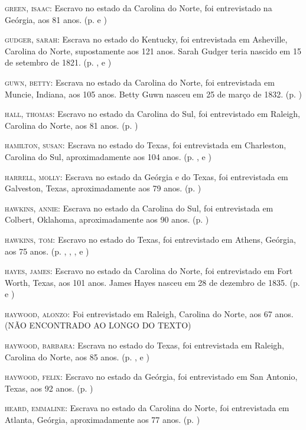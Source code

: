 \begin{Parskip}
\textsc{green, isaac:} Escravo no estado da Carolina do Norte, foi
entrevistado na Geórgia, aos 81 anos. (p. \pageref{ref112} e \pageref{ref113})

\textsc{gudger, sarah:} Escrava no estado do Kentucky, foi entrevistada
em Asheville, Carolina do Norte, supostamente aos 121 anos. Sarah Gudger
teria nascido em 15 de setembro de 1821. (p. \pageref{ref114}, \pageref{ref115} e \pageref{ref116})

\textsc{guwn, betty:} Escrava no estado da Carolina do Norte, foi
entrevistada em Muncie, Indiana, aos 105 anos. Betty Guwn nasceu em 25
de março de 1832. (p. \pageref{ref117})

\textsc{hall, thomas:} Escravo no estado da Carolina do Sul, foi
entrevistado em Raleigh, Carolina do Norte, aos 81 anos. (p. \pageref{ref118})

\textsc{hamilton, susan:} Escrava no estado do Texas, foi entrevistada
em Charleston, Carolina do Sul, aproximadamente aos 104 anos. (p. \pageref{ref119}, \pageref{ref120} e \pageref{ref121})

\textsc{harrell, molly:} Escrava no estado da Geórgia e do Texas, foi
entrevistada em Galveston, Texas, aproximadamente aos 79 anos. (p. \pageref{ref122})

\textsc{hawkins, annie:} Escrava no estado da Carolina do Sul, foi
entrevistada em Colbert, Oklahoma, aproximadamente aos 90 anos. (p. \pageref{ref123})

\textsc{hawkins, tom:} Escravo no estado do Texas, foi entrevistado em
Athens, Geórgia, aos 75 anos. (p. \pageref{ref124}, \pageref{ref125}, \pageref{ref126}, \pageref{ref127} e \pageref{ref128})

\textsc{hayes, james:} Escravo no estado da Carolina do Norte, foi
entrevistado em Fort Worth, Texas, aos 101 anos. James Hayes nasceu em
28 de dezembro de 1835. (p. \pageref{ref129} e \pageref{ref130})

\textsc{haywood, alonzo:} Foi entrevistado em Raleigh, Carolina do
Norte, aos 67 anos. (NÃO ENCONTRADO AO LONGO DO TEXTO)

\textsc{haywood, barbara:} Escrava no estado do Texas, foi entrevistada
em Raleigh, Carolina do Norte, aos 85 anos. (p. \pageref{ref131}, \pageref{ref132} e \pageref{ref133})

\textsc{haywood, felix:} Escravo no estado da Geórgia, foi entrevistado
em San Antonio, Texas, aos 92 anos. (p. \pageref{ref134})

\textsc{heard, emmaline:} Escrava no estado da Carolina do Norte, foi
entrevistada em Atlanta, Geórgia, aproximadamente aos 77 anos. (p. \pageref{ref135})


\end{Parskip}

